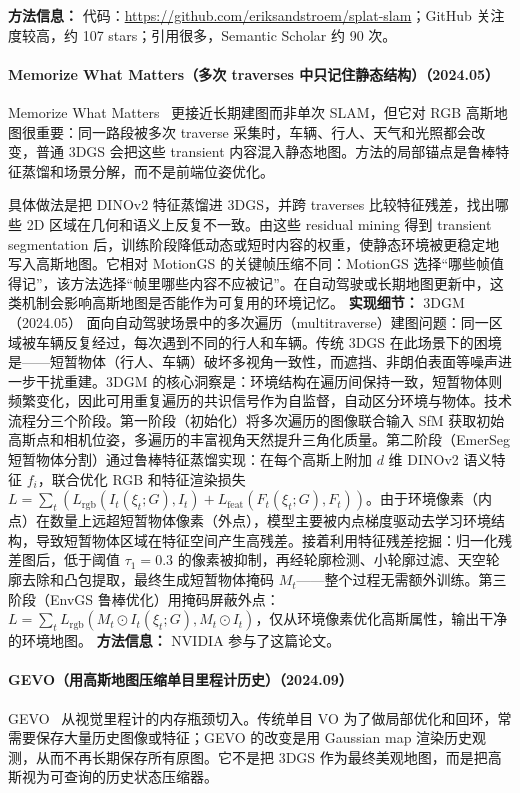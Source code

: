 \textbf{方法信息：} 代码：\url{https://github.com/eriksandstroem/splat-slam}；GitHub 关注度较高，约 107 stars；引用很多，Semantic Scholar 约 90 次。



\paragraph{Memorize What Matters（多次 traverses 中只记住静态结构）（2024.05）}
Memorize What Matters~\cite{2405_17187} 更接近长期建图而非单次 SLAM，但它对 RGB 高斯地图很重要：同一路段被多次 traverse 采集时，车辆、行人、天气和光照都会改变，普通 3DGS 会把这些 transient 内容混入静态地图。方法的局部锚点是鲁棒特征蒸馏和场景分解，而不是前端位姿优化。

具体做法是把 DINOv2 特征蒸馏进 3DGS，并跨 traverses 比较特征残差，找出哪些 2D 区域在几何和语义上反复不一致。由这些 residual mining 得到 transient segmentation 后，训练阶段降低动态或短时内容的权重，使静态环境被更稳定地写入高斯地图。它相对 MotionGS 的关键帧压缩不同：MotionGS 选择“哪些帧值得记”，该方法选择“帧里哪些内容不应被记”。在自动驾驶或长期地图更新中，这类机制会影响高斯地图是否能作为可复用的环境记忆。
\textbf{实现细节：} 3DGM（2024.05） 面向自动驾驶场景中的多次遍历（multitraverse）建图问题：同一区域被车辆反复经过，每次遇到不同的行人和车辆。传统 3DGS 在此场景下的困境是——短暂物体（行人、车辆）破坏多视角一致性，而遮挡、非朗伯表面等噪声进一步干扰重建。3DGM 的核心洞察是：环境结构在遍历间保持一致，短暂物体则频繁变化，因此可用重复遍历的共识信号作为自监督，自动区分环境与物体。技术流程分三个阶段。第一阶段（初始化）将多次遍历的图像联合输入 SfM 获取初始高斯点和相机位姿，多遍历的丰富视角天然提升三角化质量。第二阶段（EmerSeg 短暂物体分割）通过鲁棒特征蒸馏实现：在每个高斯上附加 $d$ 维 DINOv2 语义特征 $f_i$，联合优化 RGB 和特征渲染损失 $L = \sum_t(L_{\mathrm{rgb}}(I_t(\xi_t; G), I_t) + L_{\mathrm{feat}}(F_t(\xi_t; G), F_t))$。由于环境像素（内点）在数量上远超短暂物体像素（外点），模型主要被内点梯度驱动去学习环境结构，导致短暂物体区域在特征空间产生高残差。接着利用特征残差挖掘：归一化残差图后，低于阈值 $\tau_1 = 0.3$ 的像素被抑制，再经轮廓检测、小轮廓过滤、天空轮廓去除和凸包提取，最终生成短暂物体掩码 $M_t$——整个过程无需额外训练。第三阶段（EnvGS 鲁棒优化）用掩码屏蔽外点：$L = \sum_t L_{\mathrm{rgb}}(M_t \odot I_t(\xi_t; G), M_t \odot I_t)$，仅从环境像素优化高斯属性，输出干净的环境地图。
\textbf{方法信息：} NVIDIA 参与了这篇论文。



\paragraph{GEVO（用高斯地图压缩单目里程计历史）（2024.09）}
GEVO~\cite{2409_09295} 从视觉里程计的内存瓶颈切入。传统单目 VO 为了做局部优化和回环，常需要保存大量历史图像或特征；GEVO 的改变是用 Gaussian map 渲染历史观测，从而不再长期保存所有原图。它不是把 3DGS 作为最终美观地图，而是把高斯视为可查询的历史状态压缩器。

